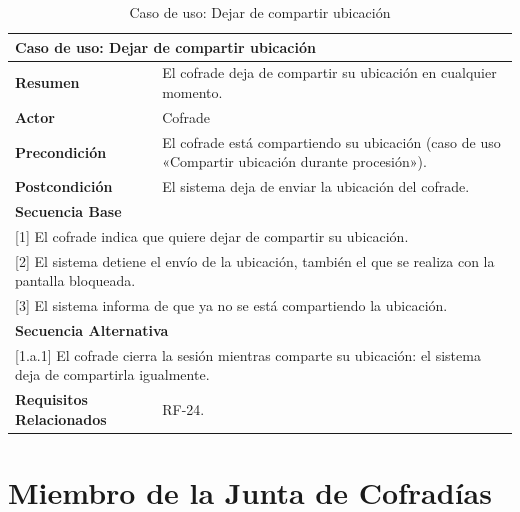 \begin{table}[h!]
    \centering
    \renewcommand{\arraystretch}{1.5}

    \begin{tabular}{|p{4cm}|p{11cm}|}
        \hline
        \multicolumn{2}{|l|}{\textbf{Caso de uso: Dejar de compartir ubicación}} \\
        \hline
        \textbf{Resumen} & El cofrade deja de compartir su ubicación en cualquier momento. \\
        \hline
        \textbf{Actor} & Cofrade \\
        \hline
        \textbf{Precondición} & El cofrade está compartiendo su ubicación (caso de uso «Compartir ubicación durante procesión»). \\
        \hline
        \textbf{Postcondición} & El sistema deja de enviar la ubicación del cofrade. \\
        \hline
        \multicolumn{2}{|l|}{\textbf{Secuencia Base}} \\
        \hline
        \multicolumn{2}{|p{15cm}|}{ [1] El cofrade indica que quiere dejar de compartir su ubicación. } \\
        \hline
        \multicolumn{2}{|p{15cm}|}{ [2] El sistema detiene el envío de la ubicación, también el que se realiza con la pantalla bloqueada. } \\
        \hline
        \multicolumn{2}{|p{15cm}|}{ [3] El sistema informa de que ya no se está compartiendo la ubicación. } \\
        \hline
        \multicolumn{2}{|l|}{\textbf{Secuencia Alternativa}} \\
        \hline
        \multicolumn{2}{|p{15cm}|}{ [1.a.1] El cofrade cierra la sesión mientras comparte su ubicación: el sistema deja de compartirla igualmente. } \\
        \hline
        \textbf{Requisitos Relacionados} & RF-24. \\
        \hline
    \end{tabular}
    \caption{Caso de uso: Dejar de compartir ubicación}
\end{table}
\section{Miembro de la Junta de Cofradías}

